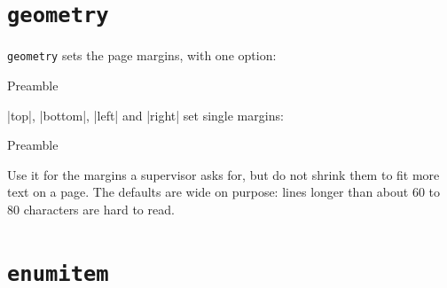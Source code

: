 \section{\texttt{geometry}}\label{sec:geometry}

\texttt{geometry} sets the page margins, with one option:

\begin{codeblocktitled}{Preamble}
\usepackage[margin=2.5cm]{geometry}
\end{codeblocktitled}

\code|top|, \code|bottom|, \code|left| and \code|right| set single margins:

\begin{codeblocktitled}{Preamble}
\usepackage[top=2cm, bottom=3cm, left=3cm, right=2cm]{geometry}
\end{codeblocktitled}

Use it for the margins a supervisor asks for,
but do not shrink them to fit more text on a page.
The defaults are wide on purpose: lines longer than about 60 to 80 characters are hard to read.

\section{\texttt{enumitem}}\label{sec:enumitem}

